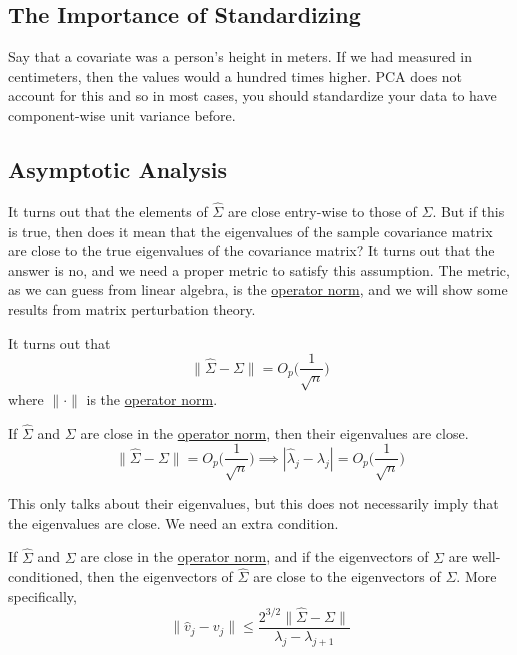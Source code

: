 \subsection{The Importance of Standardizing} 

  Say that a covariate was a person's height in meters. If we had measured in centimeters, then the values would a hundred times higher. PCA does not account for this and so in most cases, you should standardize your data to have component-wise unit variance before. 

\subsection{Asymptotic Analysis}

  It turns out that the elements of $\hat{\Sigma}$ are close entry-wise to those of $\Sigma$. But if this is true, then does it mean that the eigenvalues of the sample covariance matrix are close to the true eigenvalues of the covariance matrix? It turns out that the answer is no, and we need a proper metric to satisfy this assumption. The metric, as we can guess from linear algebra, is the \hyperref[lin-def:operator-norm-2]{operator norm}, and we will show some results from matrix perturbation theory. 

  \begin{lemma}[]
    \label{thm:turns-out-operator-norm}
    It turns out that 
    \begin{equation}
      \|\hat{\Sigma} - \Sigma\| = O_p \bigg( \frac{1}{\sqrt{n}} \bigg)
    \end{equation}
    where $\| \cdot \|$ is the \hyperref[lin-def:operator-norm-2]{operator norm}. 
  \end{lemma}

  \begin{theorem}
    \label{thm:weyls-theorem}
    If $\hat{\Sigma}$ and $\Sigma$ are close in the \hyperref[lin-def:operator-norm-2]{operator norm}, then their eigenvalues are close. 
    \begin{equation}
      \|\hat{\Sigma} - \Sigma\| = O_p \bigg( \frac{1}{\sqrt{n}} \bigg) \implies |\hat{\lambda}_j - \lambda_j| = O_p \bigg( \frac{1}{\sqrt{n}} \bigg) 
    \end{equation}
  \end{theorem}

  This only talks about their eigenvalues, but this does not necessarily imply that the eigenvalues are close. We need an extra condition. 

  \begin{theorem}
    \label{thm:david-kahan-theorem}
    If $\hat{\Sigma}$ and $\Sigma$ are close in the \hyperref[lin-def:operator-norm-2]{operator norm}, and if the eigenvectors of $\Sigma$ are well-conditioned, then the eigenvectors of $\hat{\Sigma}$ are close to the eigenvectors of $\Sigma$. More specifically, 
    \begin{equation}
      \|\hat{v}_j - v_j\| \leq \frac{2^{3/2} \|\hat{\Sigma} - \Sigma\|}{\lambda_j - \lambda_{j+1}}
    \end{equation}
  \end{theorem}



